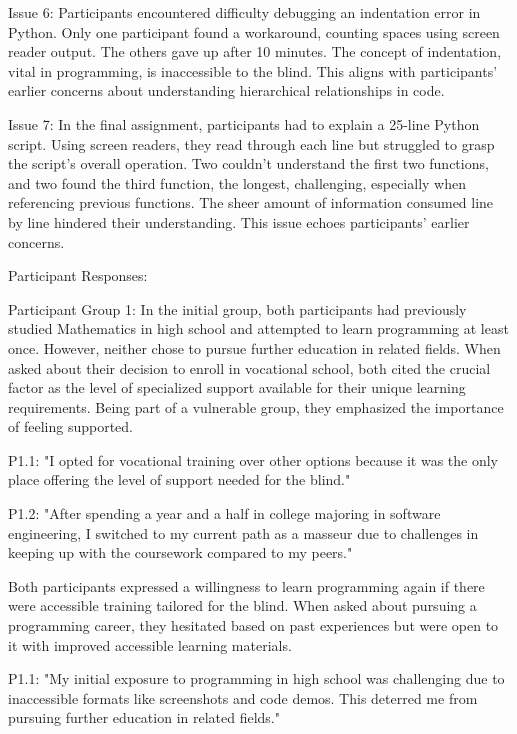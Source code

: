 Issue 6: Participants encountered difficulty debugging an indentation error in Python. Only one participant found a workaround, counting spaces using screen reader output. The others gave up after 10 minutes. The concept of indentation, vital in programming, is inaccessible to the blind. This aligns with participants' earlier concerns about understanding hierarchical relationships in code.

Issue 7: In the final assignment, participants had to explain a 25-line Python script. Using screen readers, they read through each line but struggled to grasp the script's overall operation. Two couldn't understand the first two functions, and two found the third function, the longest, challenging, especially when referencing previous functions. The sheer amount of information consumed line by line hindered their understanding. This issue echoes participants' earlier concerns.


Participant Responses:

Participant Group 1: In the initial group, both participants had previously studied Mathematics in high school and attempted to learn programming at least once. However, neither chose to pursue further education in related fields. When asked about their decision to enroll in vocational school, both cited the crucial factor as the level of specialized support available for their unique learning requirements. Being part of a vulnerable group, they emphasized the importance of feeling supported.

P1.1: "I opted for vocational training over other options because it was the only place offering the level of support needed for the blind."

P1.2: "After spending a year and a half in college majoring in software engineering, I switched to my current path as a masseur due to challenges in keeping up with the coursework compared to my peers."

Both participants expressed a willingness to learn programming again if there were accessible training tailored for the blind. When asked about pursuing a programming career, they hesitated based on past experiences but were open to it with improved accessible learning materials.

P1.1: "My initial exposure to programming in high school was challenging due to inaccessible formats like screenshots and code demos. This deterred me from pursuing further education in related fields."

